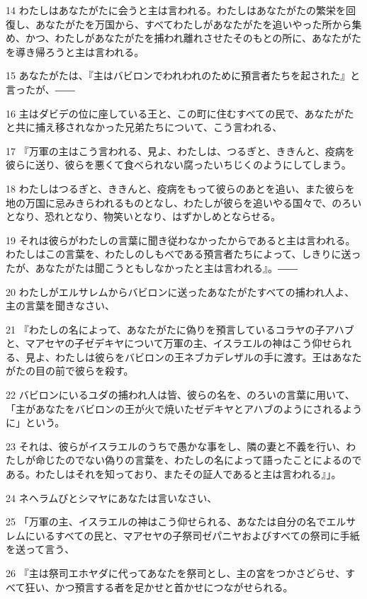 \par 14 わたしはあなたがたに会うと主は言われる。わたしはあなたがたの繁栄を回復し、あなたがたを万国から、すべてわたしがあなたがたを追いやった所から集め、かつ、わたしがあなたがたを捕われ離れさせたそのもとの所に、あなたがたを導き帰ろうと主は言われる。
\par 15 あなたがたは、『主はバビロンでわれわれのために預言者たちを起された』と言ったが、――
\par 16 主はダビデの位に座している王と、この町に住むすべての民で、あなたがたと共に捕え移されなかった兄弟たちについて、こう言われる、
\par 17 『万軍の主はこう言われる、見よ、わたしは、つるぎと、ききんと、疫病を彼らに送り、彼らを悪くて食べられない腐ったいちじくのようにしてしまう。
\par 18 わたしはつるぎと、ききんと、疫病をもって彼らのあとを追い、また彼らを地の万国に忌みきらわれるものとなし、わたしが彼らを追いやる国々で、のろいとなり、恐れとなり、物笑いとなり、はずかしめとならせる。
\par 19 それは彼らがわたしの言葉に聞き従わなかったからであると主は言われる。わたしはこの言葉を、わたしのしもべである預言者たちによって、しきりに送ったが、あなたがたは聞こうともしなかったと主は言われる』。――
\par 20 わたしがエルサレムからバビロンに送ったあなたがたすべての捕われ人よ、主の言葉を聞きなさい、
\par 21 『わたしの名によって、あなたがたに偽りを預言しているコラヤの子アハブと、マアセヤの子ゼデキヤについて万軍の主、イスラエルの神はこう仰せられる、見よ、わたしは彼らをバビロンの王ネブカデレザルの手に渡す。王はあなたがたの目の前で彼らを殺す。
\par 22 バビロンにいるユダの捕われ人は皆、彼らの名を、のろいの言葉に用いて、「主があなたをバビロンの王が火で焼いたゼデキヤとアハブのようにされるように」という。
\par 23 それは、彼らがイスラエルのうちで愚かな事をし、隣の妻と不義を行い、わたしが命じたのでない偽りの言葉を、わたしの名によって語ったことによるのである。わたしはそれを知っており、またその証人であると主は言われる』」。
\par 24 ネヘラムびとシマヤにあなたは言いなさい、
\par 25 「万軍の主、イスラエルの神はこう仰せられる、あなたは自分の名でエルサレムにいるすべての民と、マアセヤの子祭司ゼパニヤおよびすべての祭司に手紙を送って言う、
\par 26 『主は祭司エホヤダに代ってあなたを祭司とし、主の宮をつかさどらせ、すべて狂い、かつ預言する者を足かせと首かせにつながせられる。
